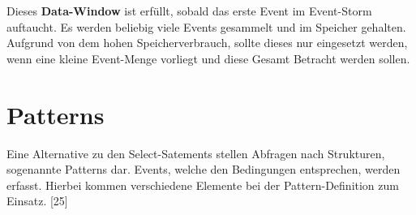 Dieses \textbf{Data-Window} ist erfüllt, sobald das erste Event im Event-Storm auftaucht. Es werden beliebig viele Events gesammelt und im Speicher gehalten.
Aufgrund von dem hohen Speicherverbrauch, sollte dieses nur eingesetzt werden, wenn eine kleine Event-Menge vorliegt und diese Gesamt Betracht werden sollen.

\section{Patterns}

Eine Alternative zu den Select-Satements stellen Abfragen nach Strukturen, sogenannte Patterns dar. Events, welche den Bedingungen entsprechen, werden erfasst. Hierbei kommen verschiedene Elemente bei der Pattern-Definition zum Einsatz.
\cite{EsperRef2018}[25]

